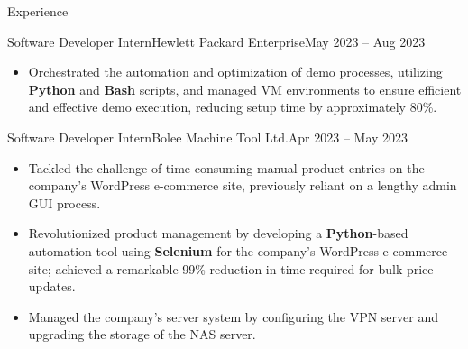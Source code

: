 \documentclass[]{mcdowellcv}
\begin{document}
\begin{cvsection}{Experience}
\begin{cvsubsection}{Software Developer Intern}{Hewlett Packard Enterprise}{May 2023 -- Aug 2023}
\begin{itemize}
				\item Orchestrated the automation and optimization of demo processes, utilizing \textbf{Python} and \textbf{Bash} scripts, and managed VM environments to ensure efficient and effective demo execution, reducing setup time by approximately 80\%.
			\end{itemize}
		\end{cvsubsection}
		\begin{cvsubsection}{Software Developer Intern}{Bolee Machine Tool Ltd.}{Apr 2023 -- May 2023}	
			\begin{itemize}
				\item Tackled the challenge of time-consuming manual product entries on the company's WordPress e-commerce site, previously reliant on a lengthy admin GUI process.
				\item Revolutionized product management by developing a \textbf{Python}-based automation tool using \textbf{Selenium} for the company's WordPress e-commerce site; achieved a remarkable 99\% reduction in time required for bulk price updates.
				\item Managed the company’s server system by configuring the VPN server and upgrading the storage of the NAS server.
			\end{itemize}
		\end{cvsubsection}
	\end{cvsection}
	
	
\end{document}
